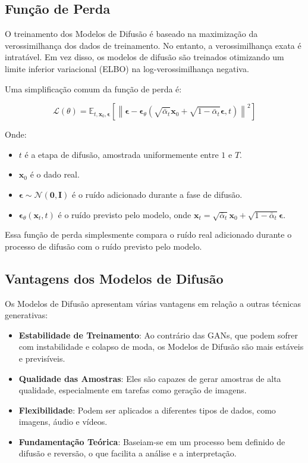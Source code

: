 \documentclass{tufte-handout}
\begin{document}
\subsection{Função de Perda}

O treinamento dos Modelos de Difusão é baseado na maximização da verossimilhança dos dados de treinamento. No entanto, a verossimilhança exata é intratável. Em vez disso, os modelos de difusão são treinados otimizando um limite inferior variacional (ELBO) na log-verossimilhança negativa.

Uma simplificação comum da função de perda é:

\begin{equation}
    \mathcal{L}(\theta) = \mathbb{E}_{t, \mathbf{x}_0, \boldsymbol{\epsilon}} \left[ \left\| \boldsymbol{\epsilon} - \boldsymbol{\epsilon}_\theta(\sqrt{\bar{\alpha}_t} \mathbf{x}_0 + \sqrt{1 - \bar{\alpha}_t} \boldsymbol{\epsilon}, t) \right\|^2 \right]
\end{equation}

Onde:
\begin{itemize}
    \item $t$ é a etapa de difusão, amostrada uniformemente entre $1$ e $T$.
    \item $\mathbf{x}_0$ é o dado real.
    \item $\boldsymbol{\epsilon} \sim \mathcal{N}(\mathbf{0}, \mathbf{I})$ é o ruído adicionado durante a fase de difusão.
    \item $\boldsymbol{\epsilon}_\theta(\mathbf{x}_t, t)$ é o ruído previsto pelo modelo, onde $\mathbf{x}_t = \sqrt{\bar{\alpha}_t} \mathbf{x}_0 + \sqrt{1 - \bar{\alpha}_t} \boldsymbol{\epsilon}$.
\end{itemize}

Essa função de perda simplesmente compara o ruído real adicionado durante o processo de difusão com o ruído previsto pelo modelo.

\subsection{Vantagens dos Modelos de Difusão}

Os Modelos de Difusão apresentam várias vantagens em relação a outras técnicas generativas:
\begin{itemize}
    \item \textbf{Estabilidade de Treinamento}: Ao contrário das GANs, que podem sofrer com instabilidade e colapso de moda, os Modelos de Difusão são mais estáveis e previsíveis.
    \item \textbf{Qualidade das Amostras}: Eles são capazes de gerar amostras de alta qualidade, especialmente em tarefas como geração de imagens.
    \item \textbf{Flexibilidade}: Podem ser aplicados a diferentes tipos de dados, como imagens, áudio e vídeos.
    \item \textbf{Fundamentação Teórica}: Baseiam-se em um processo bem definido de difusão e reversão, o que facilita a análise e a interpretação.
\end{itemize}
\end{document}

